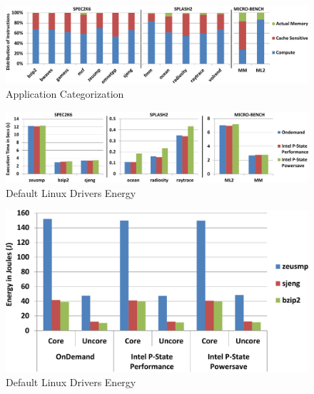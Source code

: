 \begin{figure}
  \begin{center}
    \includegraphics[width=\linewidth]{figs/app-cat-crop.pdf}
  \end{center}
  \vspace{-0.05in}
  \caption{Application Categorization}
  \vspace{-0.04in}
  \label{fig:appl-cat}
\end{figure}


\begin{figure}
  \begin{center}
\includegraphics[width=\linewidth]{figs/def-exec-time-crop.pdf}
  \end{center}
  \vspace{-0.1in}
  \caption{Default Linux Drivers Energy}
  \label{fig:sched-results}
\end{figure}


\begin{figure}
  \begin{center}
\includegraphics[width=\linewidth]{figs/def-drivers-spec-crop.pdf}
  \end{center}
  \vspace{-0.1in}
  \caption{Default Linux Drivers Energy}
  \label{fig:sched-results}
\end{figure}

